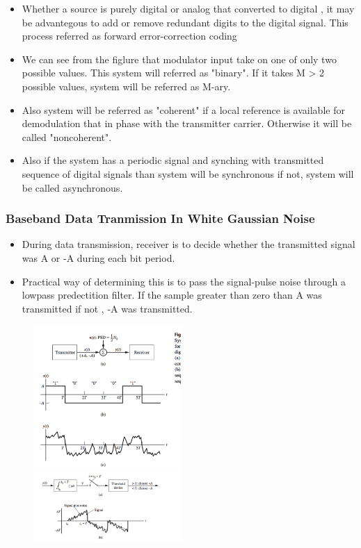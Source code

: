 \documentclass{beamer}
\begin{document}
			\begin{frame}
			\begin{itemize}
			\item Whether  a source is purely digital or analog that converted to digital , it may be advantegous to add or remove redundant  digits to the digital signal. This process referred as forward error-correction coding
			\item We can see from the figlure that modulator input take on one of only two possible values. This system will referred as "binary". If it takes M > 2 possible values, system will be referred as M-ary.
			\item Also system will be referred as "coherent" if a local reference is available for demodulation that in phase with the transmitter carrier. Otherwise it will be called "noncoherent".
			\item Also if the system has a periodic signal and synching with transmitted sequence of digital signals than system will be synchronous if not, system will be called asynchronous.
			\end{itemize}
			\end{frame}
			
			\begin{frame}
			\frametitle{Baseband Data Tranmission In White Gaussian Noise}
			\begin{itemize}
			\item  During data transmission, receiver is to decide whether the transmitted signal was A or -A during each bit period.
			\item Practical way of determining this is to pass the signal-pulse noise through a lowpass predectition filter. If the sample greater than zero than A was transmitted if not , -A was transmitted.
			\end{itemize}
			\end{frame}
			
			\begin{frame}
			\begin{figure}
			\includegraphics[width=0.5\textwidth]{9.png}
			\includegraphics[width=0.5\textwidth]{9-1.png}
			\end{figure}
			\end{frame}
			
\end{document}
